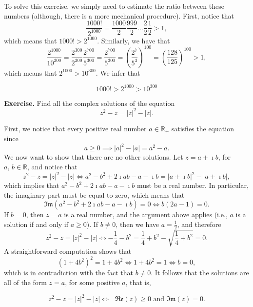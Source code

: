 \documentclass[a4paper,10 pt]{report}
\newcommand{\finalanswer}[1]{%
    \begin{finalAnswer}
    \[
        #1
    \]
    \end{finalAnswer}
}
\theoremstyle{definition}
\newcommand{\R}{\mathbb R}
\begin{document}
\begin{solutionBox} To solve this exercise, we simply need to estimate the ratio between these numbers (although, there is a more mechanical procedure). First, notice that
\begin{equation*} \frac{1000!}{2^{1000}} = \frac{1000}{2} \frac{999}{2} \dots \frac{2}{2} \frac{1}{2} > 1, \end{equation*}
which means that $1000! > 2^{1000}$. Similarly, we have that
\begin{equation*} \frac{2^{1000}}{10^{300}} = \frac{2^{300}}{2^{300}} \frac{2^{700}}{5^{300}} = \frac{2^{700}}{5^{300}} = \left( \frac{2^7}{5^3}\right)^{100} = \left( \frac{128}{125}\right)^100 > 1,\end{equation*}
which means that $2^{1000} > 10^{300}$. We infer that
\finalanswer{
  1000! > 2^{1000} > 10^{300}}
\end{solutionBox}

\begin{exerciseBox} \textbf{Exercise.} Find all the complex solutions of the equation
\begin{equation*} z^2 - z = |z|^2 - |z|. \end{equation*}
\end{exerciseBox}

\begin{solutionBox}
 First, we notice that every positive real number $a \in \R_+$ satisfies the equation since
\begin{equation*}a \geq 0 \implies |a|^2 - |a| = a^2 - a. \end{equation*}
We now want to show that there are no other solutions. Let $z = a + \imath b$, for $a, \, b \in \R$, and notice that
\begin{equation*} z^2 - z = |z|^2 - |z| \iff a^2 - b^2 + 2\imath a b - a - \imath b = |a + \imath b|^2 - |a + \imath b|,  \end{equation*}
which implies that $a^2 - b^2 + 2\imath a b - a - \imath b$ must be a real number. In particular, the imaginary part must be equal to zero, which means that
\begin{equation*} \mathfrak{Im}(a^2 - b^2 + 2\imath a b - a - \imath b) = 0 \iff b(2a - 1) = 0. \end{equation*}
If $b = 0$, then $z = a$ is a real number, and the argument above applies (i.e., $a$ is a solution if and only if $a \geq 0$). If $b \neq 0$, then we have $a = \frac{1}{2}$, and therefore
\begin{equation*} z^2 - z = |z|^2 - |z| \iff - \frac{1}{4} - b^2 = \frac{1}{4} + b^2 - \sqrt{ \frac{1}{4} + b^2 } = 0. \end{equation*}
A straightforward computation shows that
\begin{equation*} (1 + 4b^2)^2 = 1 + 4b^2 \iff 1 + 4b^2 = 1 \iff b = 0, \end{equation*}
which is in contradiction with the fact that $b \neq 0$. It follows that the solutions are all of the form $z = a$, for some positive $a$, that is,
\finalanswer{z^2 - z = |z|^2 - |z| \iff\text{ $\mathfrak{Re}(z) \geq 0$ and $\mathfrak{Im}(z) = 0$}.}\end{solutionBox}
\end{document}
